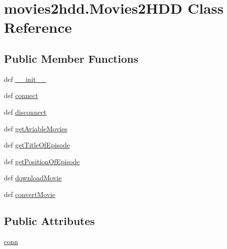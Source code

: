 \hypertarget{classmovies2hdd_1_1_movies2_h_d_d}{\section{movies2hdd.\-Movies2\-H\-D\-D Class Reference}
\label{classmovies2hdd_1_1_movies2_h_d_d}
}
\subsection*{Public Member Functions}
\begin{DoxyCompactItemize}
\item 
def \hyperlink{classmovies2hdd_1_1_movies2_h_d_d_a6652371462723d08b714c32324f5a80f}{\-\_\-\-\_\-init\-\_\-\-\_\-}
\item 
def \hyperlink{classmovies2hdd_1_1_movies2_h_d_d_af1ae63dd9190690575b5b288a52af8a5}{connect}
\item 
def \hyperlink{classmovies2hdd_1_1_movies2_h_d_d_a37549cf56f3067c26f46dabe91178fb5}{disconnect}
\item 
def \hyperlink{classmovies2hdd_1_1_movies2_h_d_d_a2675dbf00e8e9ddbc463e802d98d6f57}{get\-Aviable\-Movies}
\item 
def \hyperlink{classmovies2hdd_1_1_movies2_h_d_d_af70b18fab503d288570e9c97e3e0cc46}{get\-Title\-Of\-Episode}
\item 
def \hyperlink{classmovies2hdd_1_1_movies2_h_d_d_a9624d2e28e7a965f3385ac27ae8ad380}{get\-Position\-Of\-Episode}
\item 
def \hyperlink{classmovies2hdd_1_1_movies2_h_d_d_a5f7d4ca7f7c30de9cfa305282ac63fbf}{download\-Movie}
\item 
def \hyperlink{classmovies2hdd_1_1_movies2_h_d_d_afafc16b9fc0e83485db9b47d7ba7e386}{convert\-Movie}
\end{DoxyCompactItemize}
\subsection*{Public Attributes}
\begin{DoxyCompactItemize}
\item 
\hyperlink{classmovies2hdd_1_1_movies2_h_d_d_a0b93dbfa80fc06d13d8cdad9ea7bae0b}{conn}
\end{DoxyCompactItemize}
